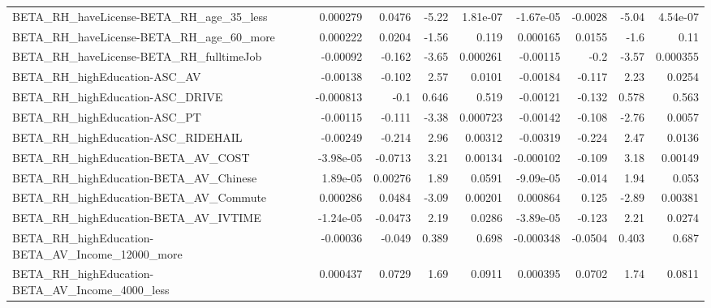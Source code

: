 \begin{tabular}{lrrrrrrrr}
BETA\_RH\_haveLicense-BETA\_RH\_age\_35\_less            &    0.000279 &       0.0476 &    -5.22 & 1.81e-07 &  -1.67e-05 &     -0.0028 &        -5.04 &      4.54e-07 \\
BETA\_RH\_haveLicense-BETA\_RH\_age\_60\_more            &    0.000222 &       0.0204 &    -1.56 &    0.119 &   0.000165 &      0.0155 &         -1.6 &          0.11 \\
BETA\_RH\_haveLicense-BETA\_RH\_fulltimeJob            &    -0.00092 &       -0.162 &    -3.65 & 0.000261 &   -0.00115 &        -0.2 &        -3.57 &      0.000355 \\
BETA\_RH\_highEducation-ASC\_AV                       &    -0.00138 &       -0.102 &     2.57 &   0.0101 &   -0.00184 &      -0.117 &         2.23 &        0.0254 \\
BETA\_RH\_highEducation-ASC\_DRIVE                    &   -0.000813 &         -0.1 &    0.646 &    0.519 &   -0.00121 &      -0.132 &        0.578 &         0.563 \\
BETA\_RH\_highEducation-ASC\_PT                       &    -0.00115 &       -0.111 &    -3.38 & 0.000723 &   -0.00142 &      -0.108 &        -2.76 &        0.0057 \\
BETA\_RH\_highEducation-ASC\_RIDEHAIL                 &    -0.00249 &       -0.214 &     2.96 &  0.00312 &   -0.00319 &      -0.224 &         2.47 &        0.0136 \\
BETA\_RH\_highEducation-BETA\_AV\_COST                 &   -3.98e-05 &      -0.0713 &     3.21 &  0.00134 &  -0.000102 &      -0.109 &         3.18 &       0.00149 \\
BETA\_RH\_highEducation-BETA\_AV\_Chinese              &    1.89e-05 &      0.00276 &     1.89 &   0.0591 &  -9.09e-05 &      -0.014 &         1.94 &         0.053 \\
BETA\_RH\_highEducation-BETA\_AV\_Commute              &    0.000286 &       0.0484 &    -3.09 &  0.00201 &   0.000864 &       0.125 &        -2.89 &       0.00381 \\
BETA\_RH\_highEducation-BETA\_AV\_IVTIME               &   -1.24e-05 &      -0.0473 &     2.19 &   0.0286 &  -3.89e-05 &      -0.123 &         2.21 &        0.0274 \\
BETA\_RH\_highEducation-BETA\_AV\_Income\_12000\_more    &    -0.00036 &       -0.049 &    0.389 &    0.698 &  -0.000348 &     -0.0504 &        0.403 &         0.687 \\
BETA\_RH\_highEducation-BETA\_AV\_Income\_4000\_less     &    0.000437 &       0.0729 &     1.69 &   0.0911 &   0.000395 &      0.0702 &         1.74 &        0.0811 \\

\end{tabular}
